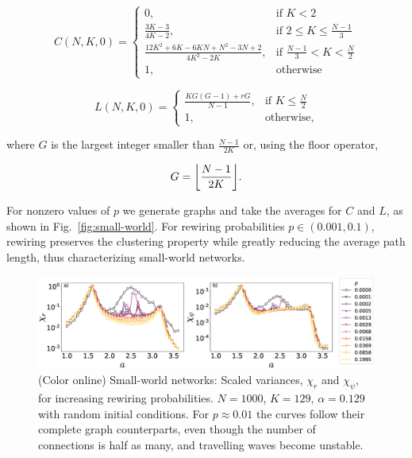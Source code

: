 \begin{equation}
C(N,K,0)=
\begin{cases}
    0 ,                                      & \text{if } K<2 \\
    \frac{3K-3}{4K-2},                       & \text{if } 2 \leq K \leq
    \frac{N-1}{3} \\
    \frac{12K^2+6K-6KN+N^2-3N+2}{4K^2-2K},   & \text{if } \frac{N-1}{3} < K <
    \frac{N}{2} \\
    1,                                       & \text{otherwise}
\end{cases}
\end{equation}

\begin{equation}
L(N,K,0)=
\begin{cases}
    \frac{KG(G-1) + rG}{N-1}, & \text{if } K \leq \frac{N}{2} \\
    1,                        & \text{otherwise},
\end{cases}
\end{equation}

\noindent where $G$ is the largest integer smaller than $\frac{N-1}{2K}$ or,
using the floor operator,

\begin{equation*}
    G = \floor*{\frac{N-1}{2K}} .
\end{equation*}

For nonzero values of $p$ we generate graphs and take the averages for $C$ and $L$, as shown in Fig.~\ref{fig:small-world}. For
rewiring probabilities $p \in \left( 0.001, 0.1 \right)$, rewiring preserves the clustering property while greatly reducing the average
path length, thus characterizing small-world networks.

\begin{figure}
\begin{center}
    \includegraphics[width=1.\textwidth]{fig/chap2/chi_curves_pvalue.eps}
    \caption{\label{fig:chicurvespvalue} (Color online) Small-world networks: Scaled variances, $\chi_r$ and $\chi_{\psi}$, for
    increasing rewiring probabilities. $N=1000$, $K=129$, $\alpha=0.129$ with random initial conditions. For $p \approx 0.01$ the
curves follow their complete graph counterparts, even though the number of connections is half as many, and travelling waves become
unstable.  }
\end{center}
\end{figure}

